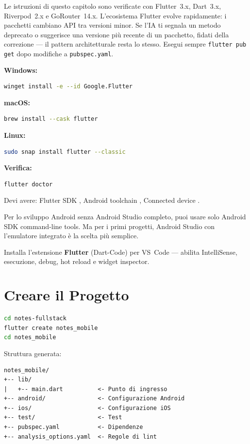 \begin{versionbox}
Le istruzioni di questo capitolo sono verificate con Flutter~3.x, Dart~3.x, Riverpod~2.x e GoRouter~14.x. L'ecosistema Flutter evolve rapidamente: i pacchetti cambiano API tra versioni minor. Se l'IA ti segnala un metodo deprecato o suggerisce una versione più recente di un pacchetto, fidati della correzione --- il pattern architetturale resta lo stesso. Esegui sempre \texttt{flutter pub get} dopo modifiche a \texttt{pubspec.yaml}.
\end{versionbox}

\begin{praticabox}[title={Pratica --- Installazione}]
\textbf{Windows:}
\begin{lstlisting}[language=bash]
winget install -e --id Google.Flutter
\end{lstlisting}

\textbf{macOS:}
\begin{lstlisting}[language=bash]
brew install --cask flutter
\end{lstlisting}

\textbf{Linux:}
\begin{lstlisting}[language=bash]
sudo snap install flutter --classic
\end{lstlisting}

\textbf{Verifica:}
\begin{lstlisting}[language=bash]
flutter doctor
\end{lstlisting}
Devi avere: Flutter SDK \checkmark, Android toolchain \checkmark, Connected device \checkmark.
\end{praticabox}

\begin{tipbox}
Per lo sviluppo Android senza Android Studio completo, puoi usare solo Android SDK command-line tools. Ma per i primi progetti, Android Studio con l'emulatore integrato è la scelta più semplice.
\end{tipbox}

Installa l'estensione \textbf{Flutter} (Dart-Code) per VS~Code --- abilita IntelliSense, esecuzione, debug, hot reload e widget inspector.

\section{Creare il Progetto}

\begin{praticabox}[title={Pratica --- Scaffold del progetto}]
\begin{lstlisting}[language=bash]
cd notes-fullstack
flutter create notes_mobile
cd notes_mobile
\end{lstlisting}
Struttura generata:
\begin{lstlisting}[language={}]
notes_mobile/
+-- lib/
|   +-- main.dart          <- Punto di ingresso
+-- android/               <- Configurazione Android
+-- ios/                   <- Configurazione iOS
+-- test/                  <- Test
+-- pubspec.yaml           <- Dipendenze
+-- analysis_options.yaml  <- Regole di lint
\end{lstlisting}
\end{praticabox}

